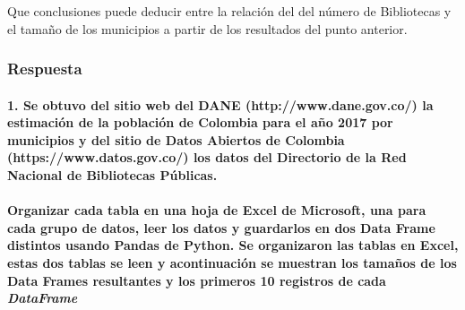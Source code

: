 \documentclass[11pt]{article}
\begin{document}
Que conclusiones puede deducir entre la relación del del número de
Bibliotecas y el tamaño de los municipios a partir de los resultados del
punto anterior.

    \hypertarget{respuesta}{%
\subsubsection{Respuesta}\label{respuesta}}

    \hypertarget{se-obtuvo-del-sitio-web-del-dane-httpwww.dane.gov.co-la-estimaciuxf3n-de-la-poblaciuxf3n-de-colombia-para-el-auxf1o-2017-por-municipios-y-del-sitio-de-datos-abiertos-de-colombia-httpswww.datos.gov.co-los-datos-del-directorio-de-la-red-nacional-de-bibliotecas-puxfablicas.}{%
\paragraph{1. Se obtuvo del sitio web del DANE (http://www.dane.gov.co/)
la estimación de la población de Colombia para el año 2017 por
municipios y del sitio de Datos Abiertos de Colombia
(https://www.datos.gov.co/) los datos del Directorio de la Red Nacional
de Bibliotecas
Públicas.}\label{se-obtuvo-del-sitio-web-del-dane-httpwww.dane.gov.co-la-estimaciuxf3n-de-la-poblaciuxf3n-de-colombia-para-el-auxf1o-2017-por-municipios-y-del-sitio-de-datos-abiertos-de-colombia-httpswww.datos.gov.co-los-datos-del-directorio-de-la-red-nacional-de-bibliotecas-puxfablicas.}}

\hypertarget{organizar-cada-tabla-en-una-hoja-de-excel-de-microsoft-una-para-cada-grupo-de-datos-leer-los-datos-y-guardarlos-en-dos-data-frame-distintos-usando-pandas-de-python.-se-organizaron-las-tablas-en-excel-estas-dos-tablas-se-leen-y-acontinuaciuxf3n-se-muestran-los-tamauxf1os-de-los-data-frames-resultantes-y-los-primeros-10-registros-de-cada-dataframe}{%
\paragraph{\texorpdfstring{Organizar cada tabla en una hoja de Excel de
Microsoft, una para cada grupo de datos, leer los datos y guardarlos en
dos Data Frame distintos usando Pandas de Python. Se organizaron las
tablas en Excel, estas dos tablas se leen y acontinuación se muestran
los tamaños de los Data Frames resultantes y los primeros 10 registros
de cada
\emph{DataFrame}}{Organizar cada tabla en una hoja de Excel de Microsoft, una para cada grupo de datos, leer los datos y guardarlos en dos Data Frame distintos usando Pandas de Python. Se organizaron las tablas en Excel, estas dos tablas se leen y acontinuación se muestran los tamaños de los Data Frames resultantes y los primeros 10 registros de cada DataFrame}}\label{organizar-cada-tabla-en-una-hoja-de-excel-de-microsoft-una-para-cada-grupo-de-datos-leer-los-datos-y-guardarlos-en-dos-data-frame-distintos-usando-pandas-de-python.-se-organizaron-las-tablas-en-excel-estas-dos-tablas-se-leen-y-acontinuaciuxf3n-se-muestran-los-tamauxf1os-de-los-data-frames-resultantes-y-los-primeros-10-registros-de-cada-dataframe}}
\end{document}
